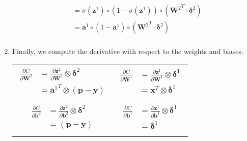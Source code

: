 \begin{enumerate}
\begin{equation}
\begin{split}
							&= \sigma(\boldsymbol{z}^1)\circ(1-\sigma(\boldsymbol{z}^1)) \circ ({\boldsymbol{W}^2}^T \cdot \boldsymbol{\delta}^2) \\
							&= \boldsymbol{a}^1 \circ(1-\boldsymbol{a}^1) \circ ({\boldsymbol{W}^2}^T \cdot \boldsymbol{\delta}^2) \\
						\end{split}
					\end{equation}
				\item Finally, we compute the derivative with respect to the weights and biases.
				\begin{tabular}{c|c}
					\parbox{14em}{
						\begin{equation}
							\begin{split}
								\frac{\partial C}{\partial \boldsymbol{W}^2}
								&= \frac{\partial \boldsymbol{z}^2}{\partial \boldsymbol{W}^2} \otimes {\boldsymbol{\delta}^2} \\
								&= {\boldsymbol{a}^1}^T \otimes {(\boldsymbol{p} - \boldsymbol{y})} \\
							\end{split}
							\label{eq:BP_w2}
						\end{equation}
					} & \parbox{14em}{
						\begin{equation}
							\begin{split}
								\frac{\partial C}{\partial \boldsymbol{W}^1}
								&= \frac{\partial \boldsymbol{z}^1}{\partial \boldsymbol{W}^1} \otimes {\boldsymbol{\delta}^1} \\
								&= \boldsymbol{x}^T \otimes {\boldsymbol{\delta}^1} \\
							\end{split}
							\label{eq:BP_w1}
						\end{equation}
					} \\
					\parbox{14em}{
						\begin{equation}
							\begin{split}
								\frac{\partial C}{\partial \boldsymbol{b}^2}
								&= \frac{\partial \boldsymbol{z}^2}{\partial \boldsymbol{b}^2} \otimes {\boldsymbol{\delta}^2} \\
								&= (\boldsymbol{p} - \boldsymbol{y}) \\
							\end{split}
							\label{eq:BP_b2}
						\end{equation}
					} & \parbox{14em}{
						\begin{equation}
							\begin{split}
								\frac{\partial C}{\partial \boldsymbol{b}^1}
								&= \frac{\partial \boldsymbol{z}^1}{\partial \boldsymbol{b}^1} \otimes {\boldsymbol{\delta}^1} \\
								&= \boldsymbol{\delta}^1 \\
							\end{split}
							\label{eq:BP_b1}
						\end{equation}
					}
				\end{tabular}
			\end{enumerate}




